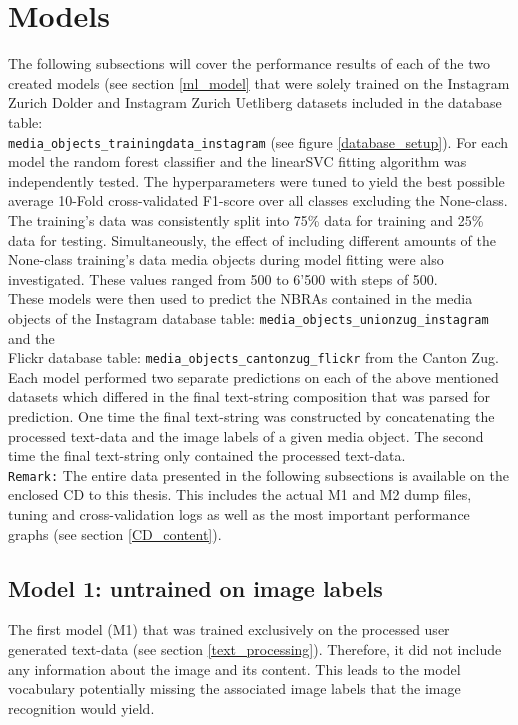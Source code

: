 \section{Models} \label{results_models}
The following subsections will cover the  performance results of each of the two created models (see section \ref{ml_model} that were solely trained on the Instagram Zurich Dolder and Instagram Zurich Uetliberg datasets included in the database table:\\ \texttt{media\_objects\_trainingdata\_instagram} (see figure \ref{database_setup}). For each model the random forest classifier and the linearSVC fitting algorithm was independently tested. The hyperparameters were tuned to yield the best possible average 10-Fold cross-validated F1-score over all classes excluding the None-class. The training's data was consistently split into 75\% data for training and 25\% data for testing. Simultaneously, the effect of including different amounts of the None-class training's data media objects during model fitting were also investigated. These values ranged from 500 to 6'500 with steps of 500.\\
These models were then used to predict the NBRAs contained in the media objects of the Instagram database table: \texttt{media\_objects\_unionzug\_instagram} and the \\Flickr database table: \texttt{media\_objects\_cantonzug\_flickr} from the Canton Zug.\\
Each model performed two separate predictions on each of the above mentioned datasets which differed in the final text-string composition that was parsed for prediction. One time the final text-string was constructed by concatenating the processed text-data and the image labels of a given media object. The second time the final text-string only contained the processed text-data.\\
\newline
\texttt{Remark:} The entire data presented in the following subsections is available on the enclosed CD to this thesis. This includes the actual M1 and M2 dump files, tuning and cross-validation logs as well as the most important performance graphs (see section \ref{CD_content}).

\subsection{Model 1: untrained on image labels}
The first model (M1) that was trained exclusively on the processed user generated text-data (see section \ref{text_processing}). Therefore, it did not include any information about the image and its content. This leads to the model vocabulary potentially missing the associated image labels that the image recognition would yield.

